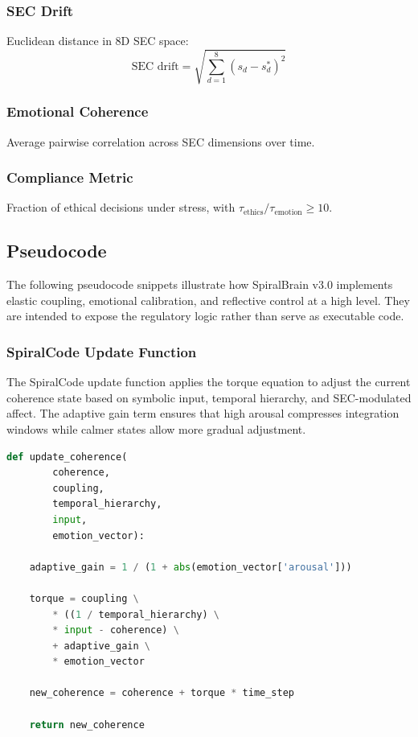 \documentclass[11pt,a4paper]{article}
\begin{document}
\subsubsection{SEC Drift}
Euclidean distance in 8D SEC space:
\[
\text{SEC drift} = \sqrt{\sum_{d=1}^8 (s_d - s_d^*)^2}
\]

\subsubsection{Emotional Coherence}
Average pairwise correlation across SEC dimensions over time.

\subsubsection{Compliance Metric}
Fraction of ethical decisions under stress, with \(\tau_{\text{ethics}} / \tau_{\text{emotion}} \geq 10\).

\subsection{Pseudocode}

The following pseudocode snippets illustrate how SpiralBrain v3.0 implements elastic coupling, emotional calibration, and reflective control at a high level. They are intended to expose the regulatory logic rather than serve as executable code.

\subsubsection{SpiralCode Update Function}

The SpiralCode update function applies the torque equation to adjust the current coherence state based on symbolic input, temporal hierarchy, and SEC-modulated affect. The adaptive gain term ensures that high arousal compresses integration windows while calmer states allow more gradual adjustment.

\begin{lstlisting}[language=Python, caption={SpiralCode update pseudocode}]
def update_coherence(
        coherence, 
        coupling, 
        temporal_hierarchy, 
        input,
        emotion_vector):
            
    adaptive_gain = 1 / (1 + abs(emotion_vector['arousal']))
    
    torque = coupling \
        * ((1 / temporal_hierarchy) \
        * input - coherence) \
        + adaptive_gain \
        * emotion_vector
    
    new_coherence = coherence + torque * time_step
    
    return new_coherence
\end{lstlisting}
\end{document}

